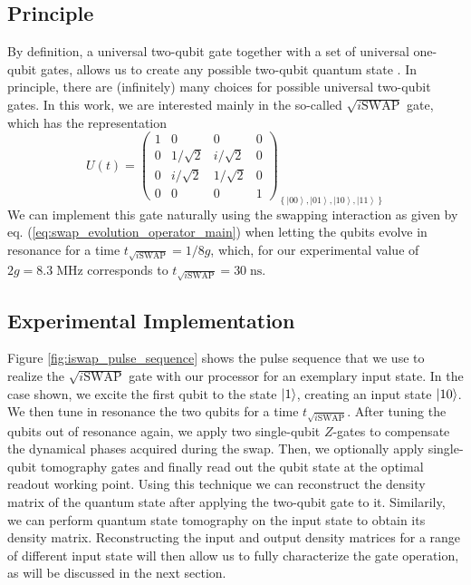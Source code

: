 \subsection{Principle}

By definition, a universal two-qubit gate together with a set of universal one-qubit gates, allows us to create any possible two-qubit quantum state \citep{barenco_elementary_1995}. In principle, there are (infinitely) many choices for possible universal two-qubit gates. In this work, we are interested mainly in the so-called $\sqrt{i\mathrm{SWAP}}$ gate, which has the representation
%
\begin{equation}
U(t)=\left(\begin{array}{cccc}
1 & 0 & 0 & 0\\
0 & 1/\sqrt{2} & i/\sqrt{2} & 0\\
0 & i/\sqrt{2} & 1/\sqrt{2} & 0\\
0 & 0 & 0 & 1\end{array}\right)_{\left\{ \left|00\right\rangle ,\left|01\right\rangle ,\left|10\right\rangle ,\left|11\right\rangle \right\} } \label{eq:sqrt_iswap_gate_main}
\end{equation}
%
We can implement this gate naturally using the swapping interaction as given by eq. (\ref{eq:swap_evolution_operator_main}) when letting the qubits evolve in resonance for a time $t_{\sqrt{i\mathrm{SWAP}}}=1/8g$, which, for our experimental value of $2g = 8.3\;\mathrm{MHz}$ corresponds to $t_{\sqrt{i\mathrm{SWAP}}}=30\;\mathrm{ns}$. 

\subsection{Experimental Implementation}

Figure \ref{fig:iswap_pulse_sequence} shows the pulse sequence that we use to realize the $\sqrt{i\mathrm{SWAP}}$ gate with our processor for an exemplary input state. In the case shown, we excite the first qubit to the state $\left| 1 \right>$, creating an input state $\left| 10 \right>$. We then tune in resonance the two qubits for a time $t_{\sqrt{i\mathrm{SWAP}}}$. After tuning the qubits out of resonance again, we apply two single-qubit $Z$-gates to compensate the dynamical phases acquired during the swap. Then, we optionally apply single-qubit tomography gates and finally read out the qubit state at the optimal readout working point. Using this technique we can reconstruct the density matrix of the quantum state after applying the two-qubit gate to it. Similarily, we can perform quantum state tomography on the input state to obtain its density matrix. Reconstructing the input and output density matrices for a range of different input state will then allow us to fully characterize the gate operation, as will be discussed in the next section.

